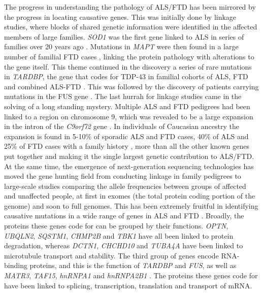 The progress in understanding the pathology of ALS/FTD has been mirrored by the progress in locating causative genes. 
This was initially done by linkage studies, where blocks of shared genetic information were identified in the affected members of large families. 
\textit{SOD1} was the first gene linked to ALS in series of families over 20 years ago \citep{Rosen1993}. 
Mutations in \textit{MAPT} were then found in a large number of familial FTD cases \citep{Hutton1998}, linking the protein pathology with alterations to the gene itself. 
This theme continued in the discovery a series of rare mutations in \textit{TARDBP}, the gene that codes for TDP-43 in familial cohorts of ALS, FTD and combined ALS-FTD \citep{Sreedharan2008-xv, Kabashi2008, Benajiba2009}. 
This was followed by the discovery of patients carrying mutations in the FUS gene \citep{Vance2009-ye}. 
The last hurrah for linkage studies came in the solving of a long standing mystery. Multiple ALS and FTD pedigrees had been linked to a region on chromosome 9, which was revealed to be a large expansion in the intron of the \textit{C9orf72} gene \citep{Renton2011,DeJesus-Hernandez2011}. In individuals of Caucasian ancestry the expansion is found in 5-10\% of sporadic ALS and FTD cases, 40\% of ALS and 25\% of FTD cases with a family history \citep{Majounie2012}, more than all the other known genes put together and making it the single largest genetic contribution to ALS/FTD. At the same time, the emergence of next-generation sequencing technologies has moved the gene hunting field from conducting linkage in family pedigrees to large-scale studies comparing the allele frequencies between groups of affected and unaffected people, at first in exomes (the total protein coding portion of the genome) and soon to full genomes. This has been extremely fruitful in identifying causative mutations in a wide range of genes in ALS and FTD  \citep{Taylor2016,Pottier2016}. 
Broadly, the proteins these genes code for can be grouped by their functions. \textit{OPTN}, \textit{UBQLN2}, \textit{SQSTM1}, \textit{CHMP2B} and \textit{TBK1} have all been linked to protein degradation, whereas \textit{DCTN1}, \textit{CHCHD10} and \textit{TUBA4A} have been linked to microtubule transport and stability. The third group of genes encode RNA-binding proteins, and this is the function of \textit{TARDBP} and \textit{FUS}, as well as \textit{MATR3}, \textit{TAF15}, \textit{hnRNPA1} and \textit{hnRNPA2B1} . The proteins these genes code for have been linked to splicing, transcription, translation and transport of mRNA. 


